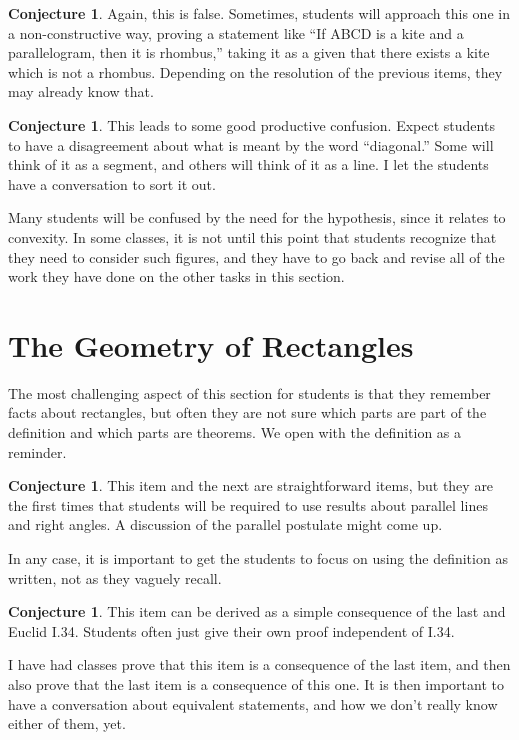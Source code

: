 \documentclass{tufte-handout}
\theoremstyle{definition}
\newtheorem{conjecture}[problem]{Conjecture}
\begin{document}
\begin{conjecture}
Again, this is false. Sometimes, students will approach this one in a non-constructive way, proving a statement like ``If ABCD is a kite and a parallelogram, then it is rhombus,'' taking it as a given that there exists a kite which is not a rhombus. Depending on the resolution of the 
previous items, they may already know that.
\end{conjecture}

\begin{conjecture}
This leads to some good productive confusion. Expect students to have a disagreement about what is meant by the word ``diagonal.'' Some will think of it as a segment, and others will think of it as a line. I let the students have a conversation to sort it out. 

Many students will be confused by the need for the hypothesis, since it relates to convexity. In some classes, it is not until this point that students recognize that they need to consider such figures, and they have to go back and revise all of the work they have done on the other tasks in this section. 
\end{conjecture}



\setcounter{section}{3}
\setcounter{problem}{0}
\section{The Geometry of Rectangles}

The most challenging aspect of this section for students is that they remember facts about rectangles, but often they are not sure which parts are part of the definition and which parts are theorems. We open with the definition as a reminder.

\begin{conjecture}
This item and the next are straightforward items, but they are the first times that students will be required to use results about parallel lines and right angles. A discussion of the parallel postulate might come up.

In any case, it is important to get the students to focus on using the definition as written, not as they vaguely recall.
\end{conjecture}

\begin{conjecture}
This item can be derived as a simple consequence of the last and Euclid I.34. Students often just give their own proof independent of I.34.

I have had classes prove that this item is a consequence of the last item, and then also prove that the last item is a consequence of this one. It is then important to have a conversation about equivalent statements, and how we don't really know either of them, yet.
\end{conjecture}
\end{document}
